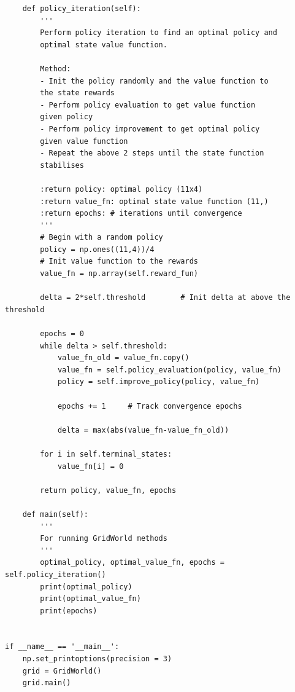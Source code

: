 \documentclass[12pt,twoside]{article}
\begin{document}
\begin{verbatim}
    def policy_iteration(self):
        '''
        Perform policy iteration to find an optimal policy and 
        optimal state value function.

        Method:
        - Init the policy randomly and the value function to 
        the state rewards
        - Perform policy evaluation to get value function 
        given policy
        - Perform policy improvement to get optimal policy 
        given value function
        - Repeat the above 2 steps until the state function 
        stabilises

        :return policy: optimal policy (11x4)
        :return value_fn: optimal state value function (11,)
        :return epochs: # iterations until convergence
        '''
        # Begin with a random policy
        policy = np.ones((11,4))/4 
        # Init value function to the rewards
        value_fn = np.array(self.reward_fun)        

        delta = 2*self.threshold        # Init delta at above the threshold

        epochs = 0
        while delta > self.threshold:
            value_fn_old = value_fn.copy()      
            value_fn = self.policy_evaluation(policy, value_fn)
            policy = self.improve_policy(policy, value_fn)

            epochs += 1     # Track convergence epochs

            delta = max(abs(value_fn-value_fn_old))

        for i in self.terminal_states:         
            value_fn[i] = 0

        return policy, value_fn, epochs

    def main(self):
        '''
        For running GridWorld methods
        '''
        optimal_policy, optimal_value_fn, epochs = self.policy_iteration()
        print(optimal_policy)
        print(optimal_value_fn)
        print(epochs)


if __name__ == '__main__':
    np.set_printoptions(precision = 3)
    grid = GridWorld()
    grid.main()
\end{verbatim}
\end{document}
